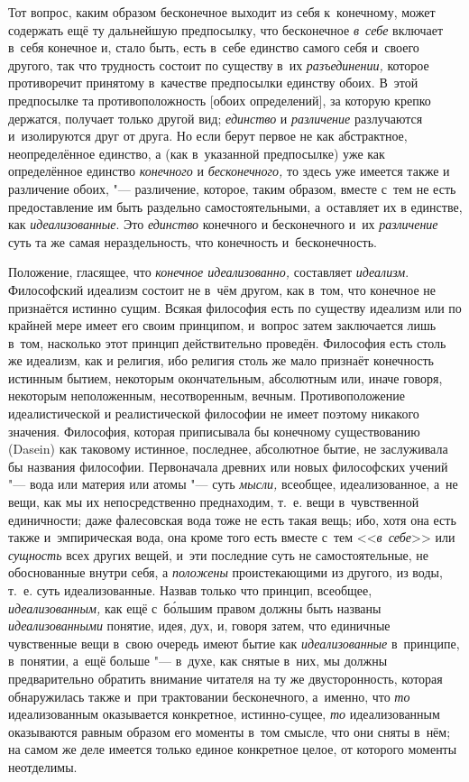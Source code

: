 Тот вопрос, каким образом бесконечное выходит из себя к~конечному, может
содержать ещё ту дальнейшую предпосылку, что бесконечное
{\em в~себе} включает в~себя конечное и, стало быть,
есть в~себе единство самого себя и~своего другого, так что трудность
состоит по существу в~их {\em разъединении,} которое
противоречит принятому в~качестве предпосылки единству обоих. В~этой
предпосылке та противоположность [обоих определений], за которую крепко
держатся, получает только другой вид; {\em единство} и
{\em различение} разлучаются и~изолируются друг от
друга. Но если берут первое не как абстрактное, неопределённое единство, а
(как в~указанной предпосылке) уже как определённое единство
{\em конечного} и {\em бесконечного,} то здесь уже имеется также и
различение обоих, "--- различение, которое, таким образом, вместе с~тем не
есть предоставление им быть раздельно самостоятельными, а~оставляет их в
единстве, как {\em идеализованные}. Это {\em единство} конечного и
бесконечного и~их {\em различение} суть та же самая нераздельность,
что конечность и~бесконечность.


Положение, гласящее, что {\em конечное идеализованно,}
составляет {\em идеализм}. Философский идеализм состоит
не в~чём другом, как в~том, что конечное не признаётся истинно сущим.
Всякая философия есть по существу идеализм или по крайней мере имеет его
своим принципом, и~вопрос затем заключается лишь в~том, насколько этот
принцип действительно проведён. Философия есть столь же идеализм, как и
религия, ибо религия столь же мало признаёт конечность истинным бытием,
некоторым окончательным, абсолютным или, иначе говоря, некоторым
неположенным, несотворенным, вечным. Противоположение идеалистической и
реалистической философии не имеет поэтому никакого значения. Философия,
которая приписывала бы конечному существованию (Dasein) как таковому
истинное, последнее, абсолютное бытие, не заслуживала бы названия
философии. Первоначала древних или новых философских учений "--- вода или
материя или атомы "--- суть {\em мысли,} всеобщее,
идеализованное, а~не вещи, как мы их непосредственно преднаходим, т.~е.
вещи в~чувственной единичности; даже фалесовская вода тоже не есть такая
вещь; ибо, хотя она есть также и~эмпирическая вода, она кроме того есть
вместе с~тем <<{\em в~себе}>> или
{\em сущность} всех других вещей, и~эти последние суть
не самостоятельные, не обоснованные внутри себя, а
{\em положены} проистекающими из другого, из
воды, т.~е. суть идеализованные. Назвав только что принцип, всеобщее,
{\em идеализованным,} как ещё с~б\'{о}льшим правом должны
быть названы {\em идеализованными} понятие, идея, дух,
и, говоря затем, что единичные чувственные вещи в~свою очередь имеют бытие
как {\em идеализованные} в~принципе, в~понятии, а~ещё
больше "--- в~духе, как снятые в~них, мы должны предварительно обратить
внимание читателя на ту же двусторонность, которая обнаружилась также и~при
трактовании бесконечного, а~именно, что {\em то}
идеализованным оказывается конкретное, истинно-сущее,
{\em то} идеализованным оказываются равным образом его
моменты в~том смысле, что они сняты в~нём; на самом же деле имеется только
единое конкретное целое, от которого моменты неотделимы.

